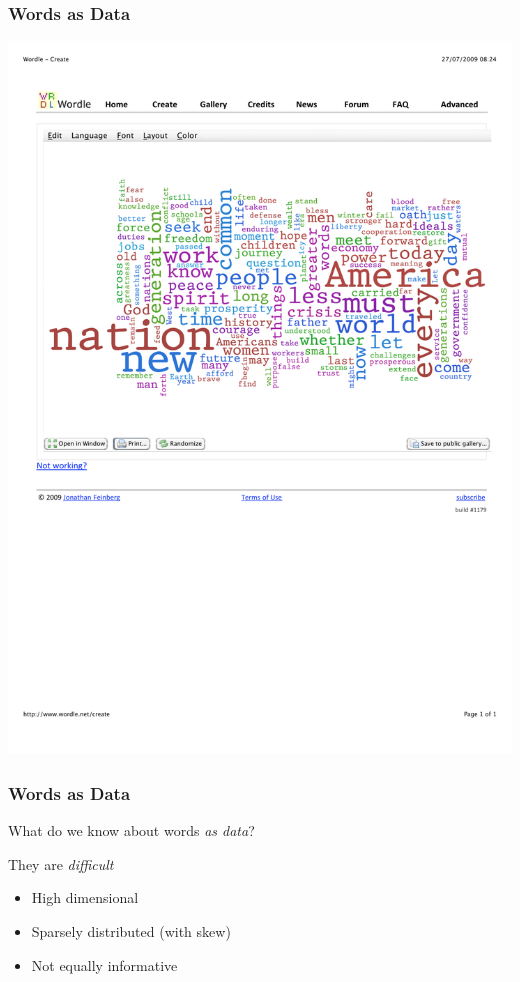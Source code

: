 \documentclass[11pt,compress,professionalfonts]{beamer}
\newcommand{\ita}{\begin{itemize}}
\newcommand{\itm}{\item[]}
\newcommand{\itz}{\end{itemize}}
\begin{document}
\begin{frame}[t]\frametitle{Words as Data}
\begin{center}
\includegraphics[scale=1.2]{pictures/obamawordle}
\end{center}


\end{frame}
\begin{frame}[t]\frametitle{Words as Data}

What do we know about words \textit{as data}?

They are \textit{difficult}
\ita
\itm High dimensional
\itm Sparsely distributed (with skew)
\itm Not equally informative
\itz


\end{frame}
\end{document}
